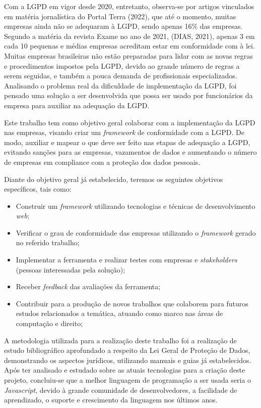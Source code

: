 \documentclass[
	12pt,				%
	openright,			%
	oneside,			%
	a4paper,			%
	english,			%
	french,				%
	spanish,			%
	brazil,				%
	]{abntex2}
\begin{document}
Com a LGPD em vigor desde 2020, entretanto, observa-se por artigos vinculados em matéria jornalística do Portal Terra (2022), que até o momento, muitas empresas ainda não se adequaram à LGPD, sendo apenas 16\% das empresas. Segundo a matéria da revista Exame no ano de 2021, (DIAS, 2021), apenas 3 em cada 10 pequenas e médias empresas acreditam estar em conformidade com à lei. Muitas empresas brasileiras não estão preparadas para lidar com as novas regras e procedimentos impostos pela LGPD, devido ao grande número de regras a serem seguidas, e também a pouca demanda de profissionais especializados. Analisando o problema real da dificuldade de implementação da LGPD, foi pensado uma solução a ser desenvolvida que possa ser usado por funcionários da empresa para auxiliar na adequação da LGPD.

Este trabalho tem como objetivo geral colaborar com a implementação da LGPD nas empresas, visando criar um \textit{framework} de conformidade com a LGPD. De modo, auxiliar e mapear o que deve ser feito nas etapas de adequação a LGPD, evitando sanções para as empresas, vazamentos de dados e aumentando o número de empresas em compliance com a proteção dos dados pessoais.

Diante do objetivo geral já estabelecido, teremos os seguintes objetivos específicos, tais como:
\begin{itemize}
\item Construir um \textit{framework} utilizando tecnologias e técnicas de desenvolvimento \textit{web};
\item Verificar o grau de conformidade das empresas utilizando o \textit{framework} gerado no referido trabalho;
\item Implementar a ferramenta e realizar testes com empresas e \textit{stakeholders} (pessoas interessadas pela solução);
\item Receber \textit{feedback} das avaliações da ferramenta;
\item Contribuir para a produção de novos trabalhos que colaborem para futuros estudos relacionados a temática, atuando como marco nas áreas de computação e direito;
\end{itemize}

A metodologia utilizada para a realização deste trabalho foi a realização de estudo bibliográfico aprofundado a respeito da Lei Geral de Proteção de Dados, demonstrando os aspectos jurídicos, utilizando manuais e guias já estabelecidos. Após ter analisado e estudado sobre as atuais tecnologias para a criação deste projeto, concluiu-se que a melhor linguagem de programação a ser usada seria o \textit{Javascript}, devido à grande comunidade de desenvolvedores, a facilidade de aprendizado, o suporte e crescimento da linguagem nos últimos anos.
\end{document}
